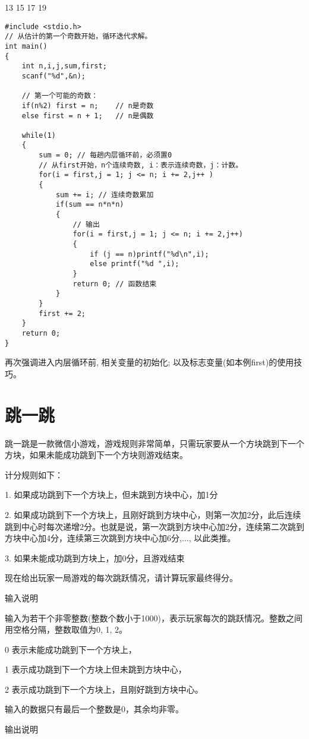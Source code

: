 13 15 17 19

\begin{lstlisting}
#include <stdio.h>
// 从估计的第一个奇数开始，循环迭代求解。
int main()
{
	int n,i,j,sum,first;
	scanf("%d",&n);
	
	// 第一个可能的奇数：
	if(n%2) first = n;    // n是奇数 
	else first = n + 1;   // n是偶数 
	
	while(1)
	{
		sum = 0; // 每趟内层循环前，必须置0 
		// 从first开始，n个连续奇数, i：表示连续奇数，j：计数。 
		for(i = first,j = 1; j <= n; i += 2,j++ ) 
		{
			sum += i; // 连续奇数累加 
			if(sum == n*n*n) 
			{
				// 输出 
				for(i = first,j = 1; j <= n; i += 2,j++) 
				{
					if (j == n)printf("%d\n",i);
					else printf("%d ",i);
				}
				return 0; // 函数结束 
			}
		}
		first += 2; 
	}
	return 0;
} 
\end{lstlisting}

\begin{note}[要点]
	再次强调进入内层循环前, 相关变量的初始化; 以及标志变量(如本例first)的使用技巧。
\end{note}


\section{跳一跳}
跳一跳是一款微信小游戏，游戏规则非常简单，只需玩家要从一个方块跳到下一个方块，如果未能成功跳到下一个方块则游戏结束。

计分规则如下：

1. 如果成功跳到下一个方块上，但未跳到方块中心，加1分

2. 如果成功跳到下一个方块上，且刚好跳到方块中心，则第一次加2分，此后连续跳到中心时每次递增2分。也就是说，第一次跳到方块中心加2分，连续第二次跳到方块中心加4分，连续第三次跳到方块中心加6分,$\dots$, 以此类推。

3. 如果未能成功跳到方块上，加0分，且游戏结束

现在给出玩家一局游戏的每次跳跃情况，请计算玩家最终得分。

输入说明
	
输入为若干个非零整数(整数个数小于1000)，表示玩家每次的跳跃情况。整数之间用空格分隔，整数取值为0, 1, 2。

0 表示未能成功跳到下一个方块上，

1 表示成功跳到下一个方块上但未跳到方块中心，

2 表示成功跳到下一个方块上，且刚好跳到方块中心。

输入的数据只有最后一个整数是0，其余均非零。

输出说明	

